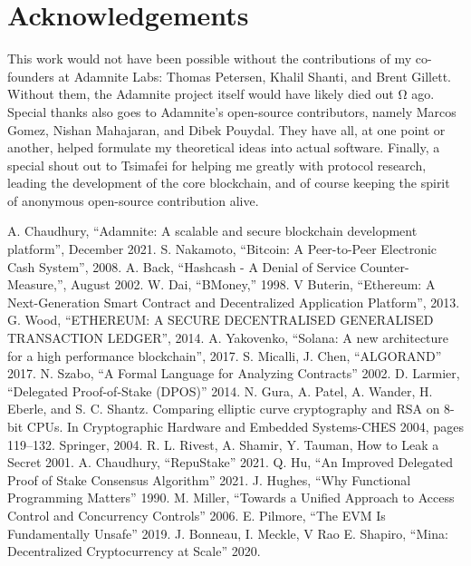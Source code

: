 \documentclass[conference]{IEEEtran}
\begin{document}
\section{Acknowledgements}
This work would not have been possible without the contributions of my co-founders at Adamnite Labs: Thomas Petersen, Khalil Shanti, and Brent Gillett. Without them, the Adamnite project itself would have likely died out Ω ago. Special thanks also goes to Adamnite's open-source contributors, namely Marcos Gomez, Nishan Mahajaran, and Dibek Pouydal. They have all, at one point or another, helped formulate my theoretical ideas into actual software. Finally, a special shout out to Tsimafei for helping me greatly with protocol research, leading the development of the core blockchain, and of course keeping the spirit of anonymous open-source contribution alive. 





\begin{thebibliography}{00}
 A. Chaudhury, ``Adamnite: A scalable and secure
blockchain development platform'', December 2021.
 S. Nakamoto, ``Bitcoin: A Peer-to-Peer Electronic Cash System'', 2008.
 A. Back, ``Hashcash - A Denial of Service Counter-Measure,'', August 2002.
 W. Dai, ``BMoney,'' 1998.
 V Buterin, ``Ethereum: A Next-Generation Smart
Contract and Decentralized Application Platform'',
2013.
 G. Wood, ``ETHEREUM: A SECURE DECENTRALISED GENERALISED TRANSACTION LEDGER'', 2014.
 A. Yakovenko, ``Solana: A new architecture for a high
performance blockchain'', 2017.
 S. Micalli, J. Chen, ``ALGORAND'' 2017.
 N. Szabo, ``A Formal Language for Analyzing Contracts'' 2002.
 D. Larmier, ``Delegated Proof-of-Stake (DPOS)'' 2014.
 N. Gura, A. Patel, A. Wander, H. Eberle,
and S. C. Shantz. Comparing elliptic curve
cryptography and RSA on 8-bit CPUs. In Cryptographic
Hardware and Embedded Systems-CHES 2004, pages
119–132. Springer, 2004.
 R. L. Rivest, A. Shamir, Y. Tauman, How to Leak a Secret 2001.
 A. Chaudhury, ``RepuStake'' 2021.
 Q. Hu, ``An Improved Delegated Proof of Stake Consensus Algorithm'' 2021.
 J. Hughes, ``Why
Functional Programming
Matters'' 1990.
 M. Miller, ``Towards a Unified Approach to Access Control and Concurrency Controls'' 2006.
 E. Pilmore, ``The EVM Is Fundamentally Unsafe'' 2019.
 J. Bonneau, I. Meckle, V Rao
 E. Shapiro, ``Mina: Decentralized Cryptocurrency at Scale'' 2020.
 




\end{thebibliography}
\end{document}
